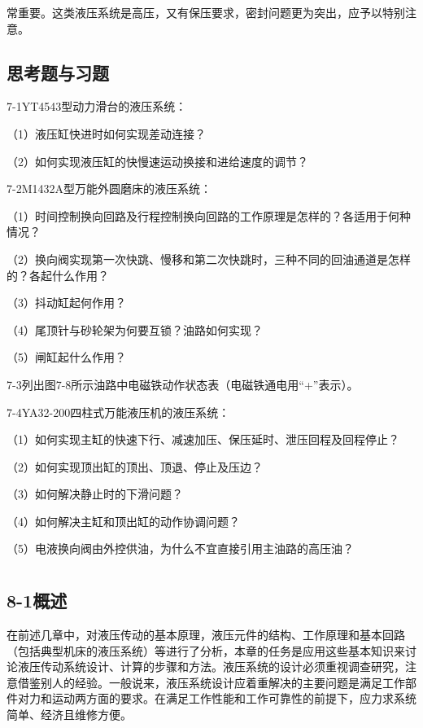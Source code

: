 常重要。这类液压系统是高压，又有保压要求，密封问题更为突出，应予以特别注意。


\section*{思考题与习题}

7-1\quad YT4543型动力滑台的液压系统：

（1）液压缸快进时如何实现差动连接？

（2）如何实现液压缸的快慢速运动换接和进给速度的调节？

7-2\quad M1432A型万能外圆磨床的液压系统：

（1）时间控制换向回路及行程控制换向回路的工作原理是怎样的？各适用于何种情况？

（2）换向阀实现第一次快跳、慢移和第二次快跳时，三种不同的回油通道是怎样的？各起什么作用？

（3）抖动缸起何作用？

（4）尾顶针与砂轮架为何要互锁？油路如何实现？

（5）闸缸起什么作用？

7-3\quad 列出图7-8所示油路中电磁铁动作状态表（电磁铁通电用“+”表示）。


7-4\quad YA32-200四柱式万能液压机的液压系统：

（1）如何实现主缸的快速下行、减速加压、保压延时、泄压回程及回程停止？

（2）如何实现顶出缸的顶出、顶退、停止及压边？

（3）如何解决静止时的下滑问题？

（4）如何解决主缸和顶出缸的动作协调问题？

（5）电液换向阀由外控供油，为什么不宜直接引用主油路的高压油？

\newpage

\chapter{}

\section{8-1\quad 概述}

在前述几章中，对液压传动的基本原理，液压元件的结构、工作原理和基本回路（包括典型机床的液压系统）等进行了分析，本章的任务是应用这些基本知识来讨论液压传动系统设计、计算的步骤和方法。液压系统的设计必须重视调查研究，注意借鉴别人的经验。一般说来，液压系统设计应着重解决的主要问题是满足工作部件对力和运动两方面的要求。在满足工作性能和工作可靠性的前提下，应力求系统简单、经济且维修方便。

